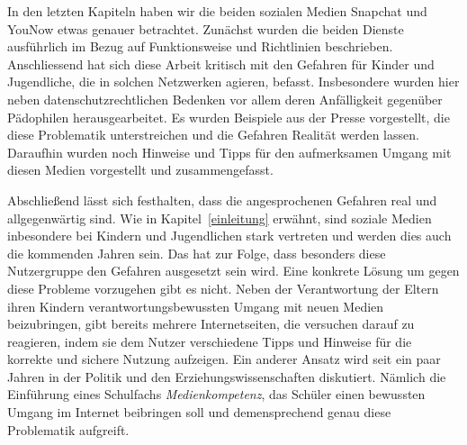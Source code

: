 In den letzten Kapiteln haben wir die beiden sozialen Medien Snapchat und
YouNow etwas genauer betrachtet. Zun\"achst wurden die beiden Dienste
ausf\"uhrlich im Bezug auf Funktionsweise und Richtlinien beschrieben.
Anschliessend hat sich diese Arbeit kritisch mit den Gefahren f\"ur Kinder und
Jugendliche, die in solchen Netzwerken agieren, befasst. Insbesondere wurden
hier neben datenschutzrechtlichen Bedenken vor allem deren Anf\"alligkeit
gegen\"uber P\"adophilen herausgearbeitet. Es wurden Beispiele aus der Presse
vorgestellt, die diese Problematik unterstreichen und die Gefahren Realit\"at
werden lassen. Daraufhin wurden noch Hinweise und Tipps f\"ur den
aufmerksamen Umgang mit diesen Medien vorgestellt und zusammengefasst.


Abschlie{\ss}end l\"asst sich festhalten, dass die angesprochenen Gefahren real
und allgegenw\"artig sind. Wie in Kapitel~\ref{einleitung} erw\"ahnt, sind
soziale Medien inbesondere bei Kindern und Jugendlichen stark vertreten und
werden dies auch die kommenden Jahren sein. Das hat zur Folge, dass besonders
diese Nutzergruppe den Gefahren ausgesetzt sein wird. Eine konkrete L\"osung um
gegen diese Probleme vorzugehen gibt es nicht. Neben der Verantwortung der
Eltern ihren Kindern verantwortungsbewussten Umgang mit neuen Medien
beizubringen, gibt bereits mehrere Internetseiten, die versuchen darauf zu
reagieren, indem sie dem Nutzer verschiedene Tipps und Hinweise f\"ur die
korrekte und sichere Nutzung aufzeigen. Ein anderer Ansatz wird seit ein paar
Jahren in der Politik und den Erziehungswissenschaften diskutiert. N\"amlich
die Einf\"uhrung eines Schulfachs \emph{Medienkompetenz}, das Sch\"uler einen
bewussten Umgang im Internet beibringen soll und demensprechend genau diese
Problematik aufgreift.
